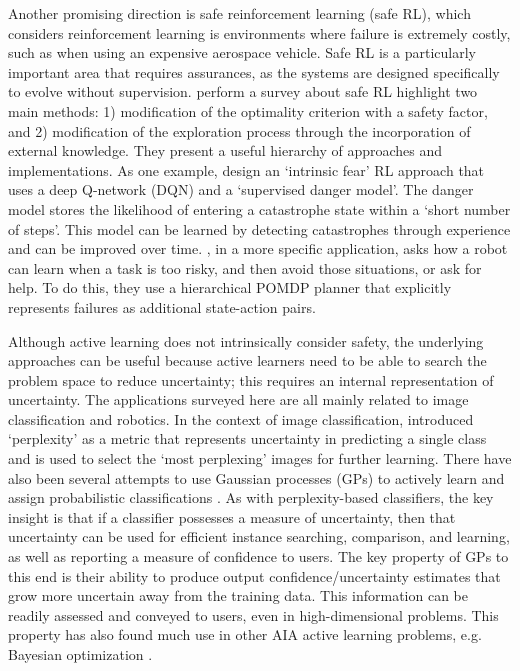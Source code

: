 Another promising direction is safe reinforcement learning (safe RL), which considers reinforcement learning is environments where failure is extremely costly, such as when using an expensive aerospace vehicle. 
Safe RL is a particularly important area that requires assurances, as the systems are designed specifically to evolve without supervision. \citet{Garcia2015-rs} perform a survey about safe RL highlight two main methods: 1) modification of the optimality criterion with a safety factor, and 2) modification of the exploration process through the incorporation of external knowledge. They present a useful hierarchy of approaches and implementations. 
As one example, \citet{Lipton2016-dq} design an `intrinsic fear' RL approach that uses a deep Q-network (DQN) and a `supervised danger model'. The danger model stores the likelihood of entering a catastrophe state within a `short number of steps'. This model can be learned by detecting catastrophes through experience and can be improved over time. \citet{Curran2016-ij}, in a more specific application, asks how a robot can learn when a task is too risky, and then avoid those situations, or ask for help. To do this, they use a hierarchical POMDP planner that explicitly represents failures as additional state-action pairs. %

    Although active learning does not intrinsically consider safety, the underlying approaches can be useful because active learners need to be able to search the problem space to reduce uncertainty; this requires an internal representation of uncertainty. The applications surveyed here are all mainly related to image classification and robotics. In the context of image classification, \citet{Paul2011-vr} introduced `perplexity' as a metric that represents uncertainty in predicting a single class and is used to select the `most perplexing' images for further learning. 
There have also been several attempts to use Gaussian processes (GPs) to actively learn and assign probabilistic classifications  \cite{MacKay1992-sp,Triebel2016-kj,Triebel2013-ow,Triebel2013-ku,Grimmett2013-gj,Grimmett2016-yc,Berczi2015-rd,Dequaire2016-kh}. 
 As with perplexity-based classifiers, the key insight is that if a classifier possesses a measure of uncertainty, then that uncertainty can be used for efficient instance searching, comparison, and learning, as well as reporting a measure of confidence to users. The key property of GPs to this end is their ability to produce output confidence/uncertainty estimates that grow more uncertain away from the training data. %
This information can be readily assessed and conveyed to users, even in high-dimensional problems. This property has also found much use in other AIA active learning problems, e.g. Bayesian optimization \cite{Snoek2012-tt, Brochu2010-tj,Israelsen2017-zb}. 

